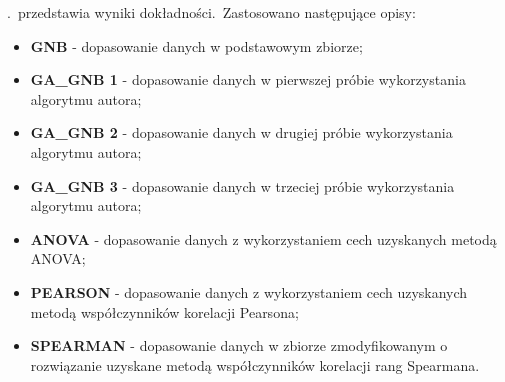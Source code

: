 \begin{table}[H]
    \centering
    \label{tab:monday-workingHours}
\end{table}

.\ przedstawia wyniki dokładności.\ Zastosowano następujące opisy:
\begin{itemize}
    \item \textbf{GNB} - dopasowanie danych w podstawowym zbiorze;
    \item \textbf{GA\_GNB 1} - dopasowanie danych w pierwszej próbie wykorzystania algorytmu autora;
    \item \textbf{GA\_GNB 2} - dopasowanie danych w drugiej próbie wykorzystania algorytmu autora;
    \item \textbf{GA\_GNB 3} - dopasowanie danych w trzeciej próbie wykorzystania algorytmu autora;
    \item \textbf{ANOVA} - dopasowanie danych z wykorzystaniem cech uzyskanych metodą ANOVA;
    \item \textbf{PEARSON} - dopasowanie danych z wykorzystaniem cech uzyskanych metodą współczynników korelacji Pearsona;
    \item \textbf{SPEARMAN} - dopasowanie danych w zbiorze zmodyfikowanym o rozwiązanie uzyskane metodą  współczynników korelacji rang Spearmana.
\end{itemize}


